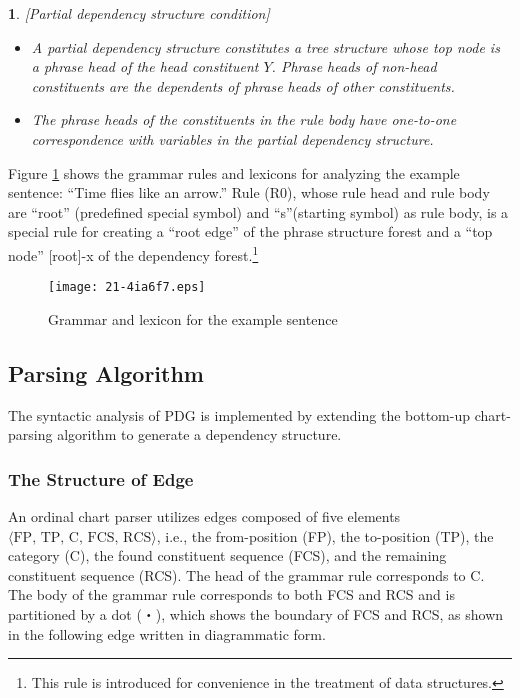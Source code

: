 \documentclass[english]{jnlp_1.4_rep}
\theoremstyle{break}
\theoremstyle{plain}
\theoremstyle{plain}
\newtheorem{definition}{}
\begin{document}
\begin{definition} \label{def:DSCondition}[Partial dependency structure condition]

\begin{itemize}
\item[(a)] A partial dependency structure constitutes a tree structure whose top node is a phrase head of the head constituent $Y$. Phrase heads of non-head constituents are the dependents of phrase heads of other constituents.
\item[(b)] The phrase heads of the constituents in the rule body have one-to-one correspondence with variables in the partial dependency structure.
\end{itemize}
\end{definition}

Figure \ref{fig:ExampleGrammar} shows the grammar rules and lexicons for
analyzing the example sentence: ``Time flies like an arrow.'' Rule (R0),
whose rule head and rule body are ``root'' (predefined special symbol)
and ``s''(starting symbol) as rule body, is a special rule for creating
a ``root edge'' of the phrase structure forest and a ``top node''
[root]-x of the dependency forest.\footnote{This rule is introduced for
  convenience in the treatment of data structures.}

\begin{figure}[t]
 \begin{center}
\texttt{[image: 21-4ia6f7.eps]}
 \end{center}
\caption{Grammar and lexicon for the example sentence}
\label{fig:ExampleGrammar}
\end{figure}


\subsection{Parsing Algorithm}
\label{sec:ParsingAlgorithm}

The syntactic analysis of PDG is implemented by extending the
bottom-up chart-parsing algorithm to generate a dependency structure.


\subsubsection{The Structure of Edge}
\label{sec:EdgeConstruction}

An ordinal chart parser utilizes edges composed of five elements
$\langle\text{FP, TP, C, FCS, RCS}\rangle$, i.e., the from-position (FP), the
to-position (TP), the category (C), the found constituent sequence
(FCS), and the remaining constituent sequence (RCS). The head of the
grammar rule corresponds to C. The body of the grammar rule
corresponds to both FCS and RCS and is partitioned by a dot (・),
which shows the boundary of FCS and RCS, as shown in the following edge
written in diagrammatic form.
\end{document}

